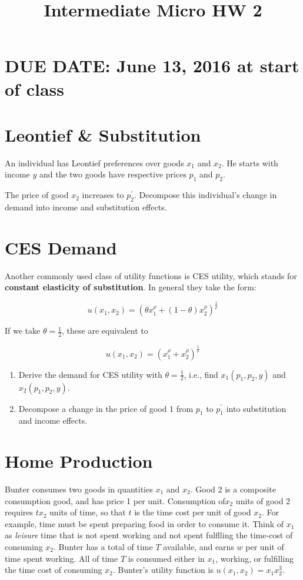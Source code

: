 \documentclass{article}
\begin{document}
\title{Intermediate Micro HW 2}

\maketitle

\section*{DUE DATE: June 13, 2016 at start of class}

\section{Leontief \& Substitution}

An individual has Leontief preferences over goods $x_1$ and $x_2$. He starts with income $y$ and the two goods have respective prices $p_1$ and $p_2$.

The price of good $x_2$ increases to $p_2^{'}$. Decompose this individual's change in demand into income and substitution effects.

\section{CES Demand}

Another commonly used class of utility functions is CES utility, which stands for \textbf{constant elasticity of substitution}. In general they take the form:

\[
u(x_1, x_2) = \left(\theta x_1^{\rho} + (1-\theta) x_2^{\rho}\right)^{\frac1{\rho}}
\]

If we take $\theta = \frac12$, these are equivalent to

\[
u(x_1, x_2) = \left(x_1^{\rho} + x_2^{\rho}\right)^{\frac1{\rho}}
\]

\begin{enumerate}
\item Derive the demand for CES utility with $\theta = \frac12$, i.e., find $x_1(p_1, p_2, y)$ and $x_2(p_1, p_2, y)$.
\item Decompose a change in the price of good 1 from $p_1$ to $p_1^{'}$ into substitution and income effects.
\end{enumerate}

\section{Home Production}

Bunter consumes two goods in quantities $x_1$ and $x_2$. Good 2 is a composite consumption good, and  has price 1 per unit. Consumption of$x_2$ units of good 2 requires $tx_2$ units of time, so that $t $ is the time cost per unit of good $x_2$. For example, time must be spent preparing food in order to consume it. Think of $x_1$ as {\em leisure} time that is not spent working and not spent fulflling the time-cost of consuming $x_2$. Bunter has a total of time $T$ available, and earns $w$ per unit of time spent working. All of time $T$ is consumed either in $x_1$, working, or fulfilling the time cost of consuming $x_2$. Bunter's utility function is $u(x_1, x_2) = x_1x_2^3$.
\end{document}
